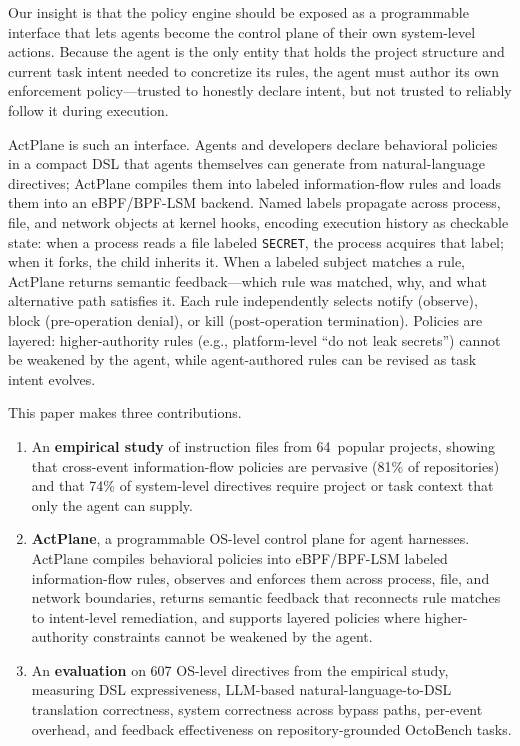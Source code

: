 Our insight is that the policy engine should be exposed as a
programmable interface that lets agents become the control plane of
their own system-level actions. Because the agent is the only entity
that holds the project structure and current task intent needed to
concretize its rules, the agent must author its own enforcement
policy---trusted to honestly declare intent, but not trusted to
reliably follow it during execution.

ActPlane is such an interface. Agents and developers declare behavioral
policies in a compact DSL that agents themselves can generate from
natural-language directives; ActPlane compiles them into labeled
information-flow rules and loads them into an eBPF/BPF-LSM backend. Named
labels propagate across process, file, and network objects at kernel hooks,
encoding execution history as checkable state: when a process reads a file
labeled \texttt{SECRET}, the process acquires that label; when it forks, the
child inherits it. When a labeled subject matches a rule, ActPlane returns
semantic feedback---which rule was matched, why, and what alternative path
satisfies it. Each rule independently selects notify (observe), block
(pre-operation denial), or kill (post-operation termination).
Policies are layered: higher-authority rules (e.g., platform-level
``do not leak secrets'') cannot be weakened by the agent, while
agent-authored rules can be revised as task intent evolves.


This paper makes three contributions.

\begin{enumerate}
\item An \textbf{empirical study} of instruction files from 64~popular
projects, showing that cross-event information-flow policies are pervasive
(81\% of repositories) and that 74\% of system-level directives require
project or task context that only the agent can supply.

\item \textbf{ActPlane}, a programmable OS-level control plane for agent
harnesses. ActPlane compiles behavioral policies into eBPF/BPF-LSM labeled
information-flow rules, observes and enforces them across process, file,
and network boundaries, returns semantic feedback that reconnects rule
matches to intent-level remediation, and supports layered policies where
higher-authority constraints cannot be weakened by the agent.

\item An \textbf{evaluation} on 607 OS-level directives from the
empirical study, measuring DSL expressiveness, LLM-based
natural-language-to-DSL translation correctness, system correctness
across bypass paths, per-event overhead, and feedback effectiveness on
repository-grounded OctoBench tasks.
\end{enumerate}
